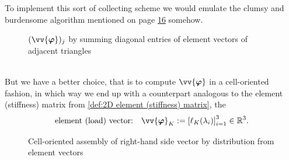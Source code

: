 	To implement this sort of collecting scheme we would emulate the clumsy 
	and burdensome algorithm mentioned on page 
	\hyperref[alg:assembleGalerkinMatrix_vertex-centered]{16} somehow.	
	\begin{figure}[!htbp]
		\centering
		
		\caption{$(\protect\vv{\bm{\varphi}})_j$ by summing diagonal entries
			of	element vectors of adjacent triangles}
		\label{tikz:2D_assemble_diagonal_element_vectors}
	\end{figure}\\
	But we have a better choice, that is to compute  $\vv{\bm{\varphi}}$
	in a cell-oriented fashion, in which way we end up with a counterpart 
	analogous to the element (stiffness) matrix from 
	\eqref{def:2D element (stiffness) matrix}, the 
	\begin{equation}\label{def:2D element (load) vector}
		\textrm{element (load) vector:}\quad \vv{\bm{\varphi}}_K := 
			\left[\ell_K(\lambda_i)\right]_{i=1}^3\in\mathbb{R}^3.
	\end{equation}\vspace{-20pt}
	\begin{figure}[!htbp]
		\centering
		
		\caption{Cell-oriented assembly of right-hand side vector by
			distribution from element vectors}
		\label{tikz:2D_cell-oriented_distribution_by_element_vectors}
	\end{figure}

